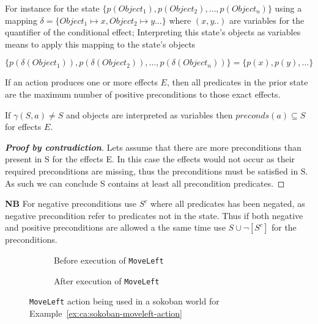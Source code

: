 \documentclass[../Master.tex]{subfiles}
\providecommand{\master}{..}
\begin{document}
For instance for the state
$\{ p(Object_1), p(Object_2),\ldots,p(Object_n)\}$ using a mapping
$\delta = \{Object_1 \mapsto x, Object_2 \mapsto y \ldots\}$
where $(x, y..)$ are variables for the quantifier of the conditional effect; Interpreting this state's objects as variables means to apply this mapping to the state's objects

$\{ p(\delta(Object_1)), p(\delta(Object_2)),\ldots,p(\delta(Object_n))\} = \{ p(x), p(y),\ldots\}$

\begin{theorem}\label{thm:ca:precondition-state}
If an action produces one or more effects $E$, then all predicates in the prior state are the maximum number of positive preconditions to those exact effects.

If $\gamma (S,a) \neq S$ and objects are interpreted as variables then $preconds(a) \subseteq S$  for effects $E$.

\begin{proof}[\textbf{Proof by contradiction}] Lets assume that there are more preconditions than present in S for the effects E.
	In this case the effects would not occur as their required preconditions are missing, thus the preconditions must be satisfied in S.
	As such we can conclude S contains at least all precondition predicates.    \qedhere
\end{proof}
\end{theorem}

\textbf{NB} For negative preconditions use $S^c$ where all predicates has been negated, as negative precondition refer to predicates not in the state.
Thus if both negative and positive preconditions are allowed a the same time use  $S \cup \neg[S^c] $ for the preconditions.

\begin{figure}
    \hspace*{0.1\textwidth}%
    \begin{subfigure}{0.35\textwidth}
        \centering
        \resizebox{\linewidth}{!}{}
        \caption{Before execution of \texttt{MoveLeft}}
    \end{subfigure}%
    \hspace*{0.1\textwidth}%
    \begin{subfigure}{0.35\textwidth}
        \centering
        \resizebox{\linewidth}{!}{}
        \caption{After execution of \texttt{MoveLeft}}
    \end{subfigure}
    \hspace*{0.1\textwidth}
	\caption{\label{fig:ca:sokoban-moveleft-action}\texttt{MoveLeft} action being used in a sokoban world for Example~\ref{ex:ca:sokoban-moveleft-action} }

\end{figure}
\end{document}
